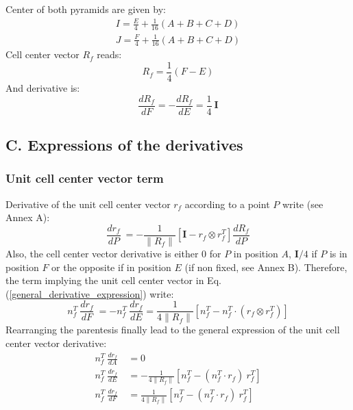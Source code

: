 \documentclass[11pt]{article}
\begin{document}
Center of both pyramids are given by:
\begin{subequations}
\begin{gather}
I = \frac{E}{4} + \frac{1}{16} (A + B + C + D) \\
J = \frac{F}{4} + \frac{1}{16} (A + B + C + D)
\end{gather}
\end{subequations} 
Cell center vector $R_f$ reads:
\begin{equation}
R_f = \frac{1}{4} (F-E)
\end{equation}
And derivative is:
\begin{equation}
\frac{d R_f}{d F} = - \frac{d R_f}{d E} = \frac{1}{4}\ \boldsymbol{I}
\end{equation}



\subsection*{C. Expressions of the derivatives}

\subsubsection*{Unit cell center vector term}

Derivative of the unit cell center vector $r_f$ according to a point $P$ write (see Annex A):
\begin{equation}
\frac{d r_f}{dP}\ = 
- \frac{1}{\| R_f \|} \left[ \boldsymbol{I} - r_f \otimes r_f^T \right] \frac{d R_f}{dP}
\end{equation}
Also, the cell center vector derivative is either 0 for $P$ in position $A$, $\boldsymbol{I} /4$ if $P$ is in position $F$ or the opposite if in position $E$ (if non fixed, see Annex B). 
Therefore, the term implying the unit cell center vector in Eq. (\ref{general_derivative_expression}) write:
\begin{equation}
n_f^T\ \frac{d r_f}{dF}\ = - n_f^T\ \frac{d r_f}{dE} =
 \frac{1}{4 \| R_f \|} \left[n_f^T- n_f^T \cdot (r_f \otimes r_f^T) \right]
\end{equation}
Rearranging the parentesis finally lead to the general expression of the unit cell center vector derivative:
\begin{subequations}
\begin{align}
n_f^T\ \frac{d r_f}{dA}\ &=  0 \\
n_f^T\ \frac{d r_f}{dE}\ &= - \frac{1}{4 \| R_f \|} \left[ n_f^T - (n_f^T \cdot r_f)\ r_f^T \right] \\
n_f^T\ \frac{d r_f}{dF}\ &=  \frac{1}{4 \| R_f \|} \left[ n_f^T - (n_f^T \cdot r_f)\  r_f^T \right]
\end{align}
\end{subequations} 
\end{document}
